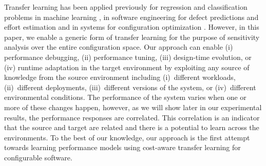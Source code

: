 Transfer learning has been applied previously for regression and classification problems in machine learning \cite{pan2010survey}, in software engineering for defect predictions \cite{krishna2016too,nam2015heterogeneous,nam2013transfer} and effort estimation \cite{kocaguneli2015transfer} and in systems for configuration optimization \cite{chen2009experience,artavc2017dice}. However, in this paper, we enable a generic form of transfer learning for the purpose of sensitivity analysis over the entire configuration space. Our approach can enable (i) performance debugging, (ii) performance tuning, (iii) design-time evolution, or (iv) runtime adaptation in the target environment by exploiting any source of knowledge from the source environment including (i)~different workloads, (ii)~different deployments, (iii)~different versions of the system, or (iv)~different environmental conditions. The performance of the system varies when one or more of these changes happen, however, as we will show later in our experimental results, the performance responses are correlated. This correlation is an indicator that the source and target are related and there is a potential to learn across the environments. To the best of our knowledge, our approach is the first attempt towards learning performance models using cost-aware transfer learning for configurable software.